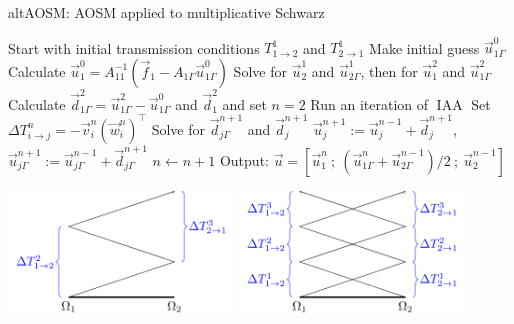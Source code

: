 \documentclass{beamer}
\DeclareMathOperator{\iaa}{IAA} %
\begin{document}
\begin{frame}
\begin{algorithm}[H]
	\caption{altAOSM: AOSM applied to multiplicative Schwarz} %
	\label{alg: alt}
	\begin{algorithmic}[1]
		\State Start with initial transmission conditions $T_{1 \to 2}^1$ and $T_{2 \to 1}^1$
		\State Make initial guess $\vec{u}_{1 \Gamma}^0$
		\State Calculate $\vec{u}_1^0 = A_{11}^{-1} ( \vec{f}_1 - A_{1 \Gamma} \vec{u}_{1 \Gamma}^0 )$
		\State Solve for $\vec{u}_2^1$ and $\vec{u}_{2 \Gamma}^1$, then for $\vec{u}_1^2$ and $\vec{u}_{1 \Gamma}^2$
		\State Calculate $\vec{d}_{1 \Gamma}^2 = \vec{u}_{1 \Gamma}^2 - \vec{u}_{1 \Gamma}^0$ and $\vec{d}_1^2$ and set $n=2$
				\State Run an iteration of $\iaa$
				\State Set $\Delta T_{i \to j}^n = - \vec{v}_i^n (\vec{w}_i^n)^\top$
				\State Solve for $\vec{d}_{j \Gamma}^{n+1}$ and $\vec{d}_j^{n+1}$
				\State $\vec{u}_j^{n+1} := \vec{u}_j^{n-1} + \vec{d}_j^{n+1}$, $\vec{u}_{j \Gamma}^{n+1} := \vec{u}_{j \Gamma}^{n-1} + \vec{d}_{j \Gamma}^{n+1}$
				\State $n \gets n+1$
			\EndFor
		\EndWhile
		\State Output: $\vec{u} = [ \vec{u}_1^n \ ; \ (\vec{u}_{1 \Gamma}^n + \vec{u}_{2 \Gamma}^{n-1})/2 \ ; \ \vec{u}_2^{n-1} ]$
	\end{algorithmic}
\end{algorithm}
\end{frame}

\begin{frame}
\centering
\includegraphics[width=0.45\textwidth]{AOSM/TIKZ_AOSM_20230614_3.png}
\includegraphics[width=0.45\textwidth]{AOSM/TIKZ_AOSM_20230614_4.png}
\end{frame}
\end{document}
